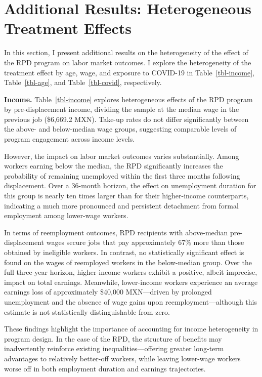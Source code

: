 \documentclass[
  4pt,
]{report}
\begin{document}
\section{Additional Results: Heterogeneous Treatment
Effects}\label{sec-additional-results}

In this section, I present additional results on the heterogeneity of
the effect of the RPD program on labor market outcomes. I explore the
heterogeneity of the treatment effect by age, wage, and exposure to
COVID-19 in Table~\ref{tbl-income}, Table~\ref{tbl-age}, and
Table~\ref{tbl-covid}, respectively.

\textbf{Income.} Table~\ref{tbl-income} explores heterogeneous effects
of the RPD program by pre-displacement income, dividing the sample at
the median wage in the previous job (\$6,669.2 MXN). Take-up rates do
not differ significantly between the above- and below-median wage
groups, suggesting comparable levels of program engagement across income
levels.

However, the impact on labor market outcomes varies substantially. Among
workers earning below the median, the RPD significantly increases the
probability of remaining unemployed within the first three months
following displacement. Over a 36-month horizon, the effect on
unemployment duration for this group is nearly ten times larger than for
their higher-income counterparts, indicating a much more pronounced and
persistent detachment from formal employment among lower-wage workers.

In terms of reemployment outcomes, RPD recipients with above-median
pre-displacement wages secure jobs that pay approximately 67\% more than
those obtained by ineligible workers. In contrast, no statistically
significant effect is found on the wages of reemployed workers in the
below-median group. Over the full three-year horizon, higher-income
workers exhibit a positive, albeit imprecise, impact on total earnings.
Meanwhile, lower-income workers experience an average earnings loss of
approximately \$40,000 MXN---driven by prolonged unemployment and the
absence of wage gains upon reemployment---although this estimate is not
statistically distinguishable from zero.

These findings highlight the importance of accounting for income
heterogeneity in program design. In the case of the RPD, the structure
of benefits may inadvertently reinforce existing inequalities---offering
greater long-term advantages to relatively better-off workers, while
leaving lower-wage workers worse off in both employment duration and
earnings trajectories.
\end{document}
